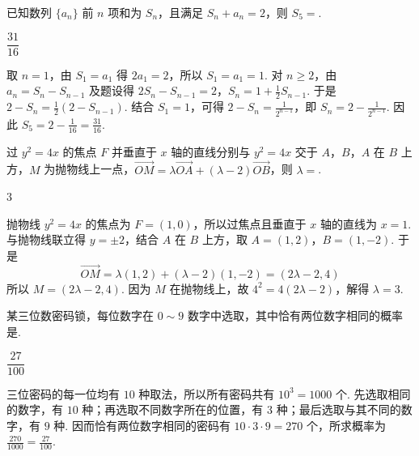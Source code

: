 \begin{problem}
已知数列 \(\{a_n\}\) 前 \(n\) 项和为 \(S_n\)，且满足 \(S_n+a_n=2\)，则 \(S_5=\)\fillinblank{}.
\end{problem}

\begin{answer}
\(\dfrac{31}{16}\)
\end{answer}

\begin{solution}
取 \(n=1\)，由 \(S_1=a_1\) 得 \(2a_1=2\)，所以 \(S_1=a_1=1\). 对 \(n\ge2\)，由 \(a_n=S_n-S_{n-1}\) 及题设得
\(2S_n-S_{n-1}=2\)，\(S_n=1+\frac12S_{n-1}\).
于是 \(2-S_n=\frac12(2-S_{n-1})\). 结合 \(S_1=1\)，可得 \(2-S_n=\frac1{2^{n-1}}\)，即 \(S_n=2-\frac1{2^{n-1}}\). 因此 \(S_5=2-\frac1{16}=\frac{31}{16}\).
\end{solution}

\begin{problem}
过 \(y^2=4x\) 的焦点 \(F\) 并垂直于 \(x\) 轴的直线分别与 \(y^2=4x\) 交于 \(A\)，\(B\)，\(A\) 在 \(B\) 上方，\(M\) 为抛物线上一点，\(\overrightarrow{OM}=\lambda\overrightarrow{OA}+(\lambda-2)\overrightarrow{OB}\)，则 \(\lambda=\)\fillinblank{}.
\end{problem}

\begin{answer}
\(3\)
\end{answer}

\begin{solution}
抛物线 \(y^2=4x\) 的焦点为 \(F=(1,0)\)，所以过焦点且垂直于 \(x\) 轴的直线为 \(x=1\). 与抛物线联立得 \(y=\pm2\)，结合 \(A\) 在 \(B\) 上方，取 \(A=(1,2)\)，\(B=(1,-2)\). 于是
\[
\overrightarrow{OM}=\lambda(1,2)+(\lambda-2)(1,-2)=(2\lambda-2,4)
\]
所以 \(M=(2\lambda-2,4)\). 因为 \(M\) 在抛物线上，故 \(4^2=4(2\lambda-2)\)，解得 \(\lambda=3\).
\end{solution}

\begin{problem}
某三位数密码锁，每位数字在 \(0\sim9\) 数字中选取，其中恰有两位数字相同的概率是\fillinblank{}.
\end{problem}

\begin{answer}
\(\dfrac{27}{100}\)
\end{answer}

\begin{solution}
三位密码的每一位均有 \(10\) 种取法，所以所有密码共有 \(10^3=1000\) 个. 先选取相同的数字，有 \(10\) 种；再选取不同数字所在的位置，有 \(3\) 种；最后选取与其不同的数字，有 \(9\) 种. 因而恰有两位数字相同的密码有 \(10\cdot3\cdot9=270\) 个，所求概率为 \(\frac{270}{1000}=\frac{27}{100}\).
\end{solution}


